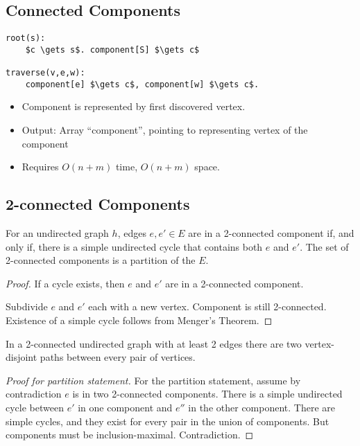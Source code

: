 \subsection{Connected Components}

\begin{lstlisting}[mathescape]
root(s):
    $c \gets s$. component[S] $\gets c$

traverse(v,e,w):
    component[e] $\gets c$, component[w] $\gets c$.
\end{lstlisting}

\begin{itemize}
\item Component is represented by first discovered vertex.
\item Output: Array ``component'', pointing to representing vertex of the component
\item Requires $O(n+m)$ time, $O(n+m)$ space.
\end{itemize}

\subsection{2-connected Components}

\begin{mylemma}
For an undirected graph $h$, edges $e, e' \in E$ are in a 2-connected component if, and only if, there is a simple undirected cycle that contains both $e$ and $e'$. The set of 2-connected components is a partition of the $E$.
\end{mylemma}
\begin{proof}
If a cycle exists, then $e$ and $e'$ are in a 2-connected component.

Subdivide $e$ and $e'$ each with a new vertex. Component is still 2-connected.
Existence of a simple cycle follows from Menger's Theorem.
\end{proof}

\begin{mytheorem}
In a 2-connected undirected graph with at least 2 edges there are two vertex-disjoint paths between every pair of vertices.
\end{mytheorem}

\begin{proof}[Proof for partition statement]
For the partition statement, assume by contradiction $e$ is in two 2-connected components. There is a simple undirected cycle between $e'$ in one component and $e''$ in the other component. 
There are simple cycles, and they exist for every pair in the union of components. But components must be inclusion-maximal. Contradiction.
\end{proof}


